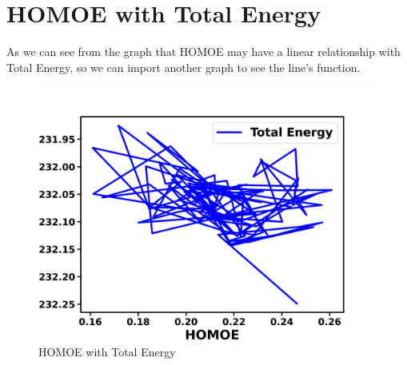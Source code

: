 \documentclass{article}
\begin{document}
\section{HOMOE with Total Energy}
As we can see from the graph that HOMOE may have a linear relationship with Total Energy, so we can import another graph to see the line's function.
\begin{figure}[H]
\centering
\includegraphics[scale=0.5]{Final.png}
\caption{HOMOE with Total Energy}
\label{fig:HOMOE with Total Energy}
\end{figure}
\end{document}
